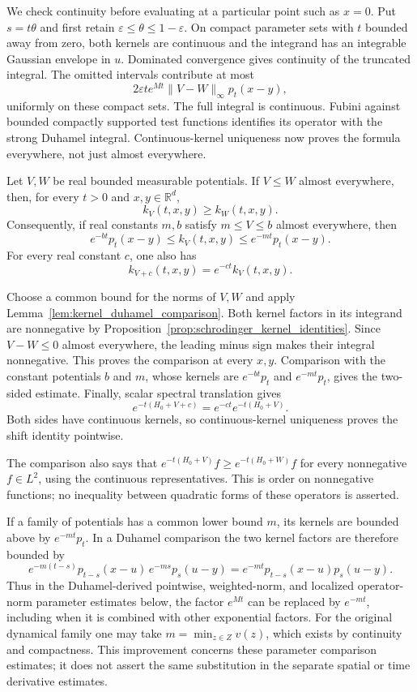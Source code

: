 We check continuity before evaluating at a particular point such as
$x=0$. Put $s=t\theta$ and first retain
$\varepsilon\leq\theta\leq1-\varepsilon$. On compact parameter sets
with $t$ bounded away from zero, both kernels are continuous and the
integrand has an integrable Gaussian envelope in $u$. Dominated
convergence gives continuity of the truncated integral. The omitted
intervals contribute at most
\[
2\varepsilon t e^{Mt}\|V-W\|_\infty p_t(x-y),
\]
uniformly on these compact sets. The full integral is continuous.
Fubini against bounded compactly supported test functions identifies
its operator with the strong Duhamel integral. Continuous-kernel
uniqueness now proves the formula everywhere, not just almost everywhere.
\Done

\begin{corollary}
\label{cor:kernel_potential_order}
Let $V,W$ be real bounded measurable potentials. If $V\leq W$
almost everywhere, then, for every $t>0$ and $x,y\in\mathbb R^d$,
\[
k_V(t,x,y)\geq k_W(t,x,y).
\]
Consequently, if real constants $m,b$ satisfy $m\leq V\leq b$
almost everywhere, then
\[
e^{-bt}p_t(x-y)\leq k_V(t,x,y)\leq e^{-mt}p_t(x-y).
\]
For every real constant $c$, one also has
\[
k_{V+c}(t,x,y)=e^{-ct}k_V(t,x,y).
\]
\end{corollary}
\Proof
Choose a common bound for the norms of $V,W$ and apply
Lemma~\ref{lem:kernel_duhamel_comparison}. Both kernel factors in
its integrand are nonnegative by
Proposition~\ref{prop:schrodinger_kernel_identities}. Since
$V-W\leq0$ almost everywhere, the leading minus sign makes their
integral nonnegative. This proves the comparison at every $x,y$.
Comparison with the constant potentials $b$ and $m$, whose kernels
are $e^{-bt}p_t$ and $e^{-mt}p_t$, gives the two-sided estimate.
Finally, scalar spectral translation gives
\[
e^{-t(H_0+V+c)}=e^{-ct}e^{-t(H_0+V)}.
\]
Both sides have continuous kernels, so continuous-kernel uniqueness
proves the shift identity pointwise.
\Done

The comparison also says that
$e^{-t(H_0+V)}f\geq e^{-t(H_0+W)}f$ for every nonnegative
$f\in L^2$, using the continuous representatives. This is order
on nonnegative functions; no inequality between quadratic forms of
these operators is asserted.

If a family of potentials has a common lower bound $m$, its kernels
are bounded above by $e^{-mt}p_t$. In a Duhamel comparison the two
kernel factors are therefore bounded by
\[
e^{-m(t-s)}p_{t-s}(x-u)\,e^{-ms}p_s(u-y)
=e^{-mt}p_{t-s}(x-u)p_s(u-y).
\]
Thus in the Duhamel-derived pointwise, weighted-norm, and localized
operator-norm parameter estimates below, the factor $e^{Mt}$ can be
replaced by $e^{-mt}$, including when it is combined with other
exponential factors. For the original dynamical family one may take
$m=\min_{z\in Z}v(z)$, which exists by continuity and compactness.
This improvement concerns these parameter comparison estimates; it
does not assert the same substitution in the separate spatial or
time derivative estimates.

